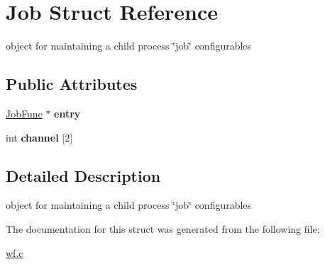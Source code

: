 \hypertarget{structJob}{}\section{Job Struct Reference}
\label{structJob}


object for maintaining a child process \char`\"{}job\char`\"{} configurables  


\subsection*{Public Attributes}
\begin{DoxyCompactItemize}
\item 
\mbox{\label{structJob_a6e1fe2a82540baa8c8ac9ef0b5d9c18d}} 
\mbox{\hyperlink{wf_8c_ad131b808f7b42fc3212215e62a999f4e}{Job\+Func}} $\ast$ {\bfseries entry}
\item 
\mbox{\label{structJob_af6e787488a9267d2d2caa9d590f785da}} 
int {\bfseries channel} \mbox{[}2\mbox{]}
\end{DoxyCompactItemize}


\subsection{Detailed Description}
object for maintaining a child process \char`\"{}job\char`\"{} configurables 

The documentation for this struct was generated from the following file\+:\begin{DoxyCompactItemize}
\item 
\mbox{\hyperlink{wf_8c}{wf.\+c}}\end{DoxyCompactItemize}
